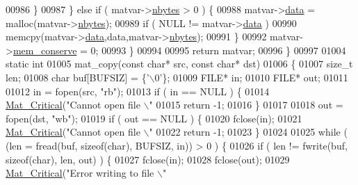 \begin{DoxyCode}
{{{{{{{{{{{{{{{{{{{{{{00986             \}
00987         \} \textcolor{keywordflow}{else} \textcolor{keywordflow}{if} ( matvar->\hyperlink{group___m_a_t_abf1c844540503be2df9bb3db93cfe307}{nbytes} > 0 ) \{
00988             matvar->\hyperlink{group___m_a_t_a5672978efa230bbdecdf38ede781f7fa}{data}   = malloc(matvar->\hyperlink{group___m_a_t_abf1c844540503be2df9bb3db93cfe307}{nbytes});
00989             \textcolor{keywordflow}{if} ( NULL != matvar->\hyperlink{group___m_a_t_a5672978efa230bbdecdf38ede781f7fa}{data} )
00990                 memcpy(matvar->\hyperlink{group___m_a_t_a5672978efa230bbdecdf38ede781f7fa}{data},data,matvar->\hyperlink{group___m_a_t_abf1c844540503be2df9bb3db93cfe307}{nbytes});
00991         \}
00992         matvar->\hyperlink{group___m_a_t_aff20e87a00691c97340ab07656a13ee7}{mem\_conserve} = 0;
00993     \}
00994 
00995     \textcolor{keywordflow}{return} matvar;
00996 \}
00997 
01004 \textcolor{keyword}{static} \textcolor{keywordtype}{int}
01005 mat\_copy(\textcolor{keyword}{const} \textcolor{keywordtype}{char}* src, \textcolor{keyword}{const} \textcolor{keywordtype}{char}* dst)
01006 \{
01007     \textcolor{keywordtype}{size\_t} len;
01008     \textcolor{keywordtype}{char} buf[BUFSIZ] = \{\textcolor{charliteral}{'\(\backslash\)0'}\};
01009     FILE* in;
01010     FILE* out;
01011 
01012     in = fopen(src, \textcolor{stringliteral}{"rb"});
01013     \textcolor{keywordflow}{if} ( in == NULL ) \{
01014         \hyperlink{group__mat__util_gaf51f2bfbb5580f575e4dd79757e2b80c}{Mat\_Critical}(\textcolor{stringliteral}{"Cannot open file \(\backslash\)"%
01015         \textcolor{keywordflow}{return} -1;
01016     \}
01017 
01018     out = fopen(dst, \textcolor{stringliteral}{"wb"});
01019     \textcolor{keywordflow}{if} ( out == NULL ) \{
01020         fclose(in);
01021         \hyperlink{group__mat__util_gaf51f2bfbb5580f575e4dd79757e2b80c}{Mat\_Critical}(\textcolor{stringliteral}{"Cannot open file \(\backslash\)"%
01022         \textcolor{keywordflow}{return} -1;
01023     \}
01024 
01025     \textcolor{keywordflow}{while} ( (len = fread(buf, \textcolor{keyword}{sizeof}(\textcolor{keywordtype}{char}), BUFSIZ, in)) > 0 ) \{
01026         \textcolor{keywordflow}{if} ( len != fwrite(buf, \textcolor{keyword}{sizeof}(\textcolor{keywordtype}{char}), len, out) ) \{
01027             fclose(in);
01028             fclose(out);
01029             \hyperlink{group__mat__util_gaf51f2bfbb5580f575e4dd79757e2b80c}{Mat\_Critical}(\textcolor{stringliteral}{"Error writing to file \(\backslash\)"%
}}}}}}}}}}}}}}}}}}}}}}}}}
\end{DoxyCode}
